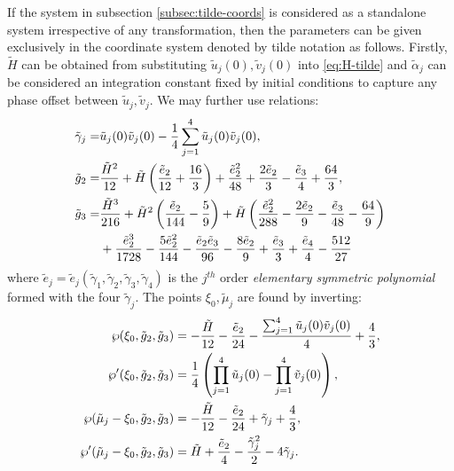 \documentclass[11pt,a4paper]{article}
\numberwithin{equation}{section}
\begin{document}
If the system in subsection \ref{subsec:tilde-coords} is considered as a standalone system irrespective of any transformation,
then the parameters can be given exclusively in the coordinate system denoted by tilde notation as follows.
Firstly, $\tilde{H}$ can be obtained from substituting $\tilde{u}_j{\left(0\right)}, \tilde{v}_j{\left(0 \right)}$ into \eqref{eq:H-tilde}
and $\tilde{\alpha}_j$ can be considered an integration constant fixed by initial conditions to capture any phase offset between $\tilde{u}_j, \tilde{v}_j$.
We may further use relations:
\begin{align}
\tilde{\gamma}_{j} =& \tilde{u}_j{\left(0\right)} \tilde{v}_j{\left(0 \right)} - \frac{1}{4}\sum_{j=1}^{4} \tilde{u}_j{\left(0\right)} \tilde{v}_j{\left(0\right)}, \notag \\
\tilde{g}_{2} =& \frac{\tilde{H}^{2}}{12} + \tilde{H} \left(\frac{{\tilde{e}}_{2}}{12} + \frac{16}{3}\right) + \frac{{\tilde{e}}_{2}^{2}}{48} + \frac{2 {\tilde{e}}_{2}}{3} - \frac{{\tilde{e}}_{3}}{4} + \frac{64}{3}, \notag \\
\tilde{g}_{3} =& \frac{\tilde{H}^{3}}{216} + \tilde{H}^{2} \left(\frac{{\tilde{e}}_{2}}{144} - \frac{5}{9}\right) + \tilde{H} \left(\frac{{\tilde{e}}_{2}^{2}}{288} - \frac{2 {\tilde{e}}_{2}}{9} - \frac{{\tilde{e}}_{3}}{48} - \frac{64}{9}\right) \notag \\
&+ \frac{{\tilde{e}}_{2}^{3}}{1728} - \frac{5 {\tilde{e}}_{2}^{2}}{144} - \frac{{\tilde{e}}_{2} {\tilde{e}}_{3}}{96} - \frac{8 {\tilde{e}}_{2}}{9} + \frac{{\tilde{e}}_{3}}{3} + \frac{{\tilde{e}}_{4}}{4} - \frac{512}{27}
\end{align}
where $\tilde{e}_j=\tilde{e}_j\left(\tilde{\gamma}_1, \tilde{\gamma}_2, \tilde{\gamma}_3, \tilde{\gamma}_4\right)$ is the $j^{th}$ order \emph{elementary symmetric polynomial} formed with the four $\tilde{\gamma}_j$. The points $\xi_0, \tilde{\mu}_j$ are found by inverting:
\begin{align}
\wp{\left(\xi_{0},\tilde{g}_{2},\tilde{g}_{3} \right)} &= - \frac{\tilde{H}}{12} - \frac{{\tilde{e}}_{2}}{24} - \frac{\sum_{j=1}^{4} \tilde{u}_j{\left(0\right)} \tilde{v}_j{\left(0\right)}}{4} + \frac{4}{3}, \notag \\
\wp'{\left(\xi_{0},\tilde{g}_{2},\tilde{g}_{3} \right)} &= \frac{1}{4}\left(\prod_{j=1}^{4}{\tilde{u}_j(0)} - \prod_{j=1}^{4}{\tilde{v}_j(0)}\right), \notag \\
\wp{\left({\tilde{\mu}}_{j} - \xi_{0},\tilde{g}_{2},\tilde{g}_{3} \right)} &= - \frac{\tilde{H}}{12} - \frac{{\tilde{e}}_{2}}{24} + {\tilde{\gamma}}_{j} + \frac{4}{3}, \notag \\
\wp'{\left({\tilde{\mu}}_{j} - \xi_{0},\tilde{g}_{2},\tilde{g}_{3} \right)} &= \tilde{H} + \frac{{\tilde{e}}_{2}}{4} - \frac{{\tilde{\gamma}}_{j}^{2}}{2} - 4 {\tilde{\gamma}}_{j}.
\end{align}
\end{document}
